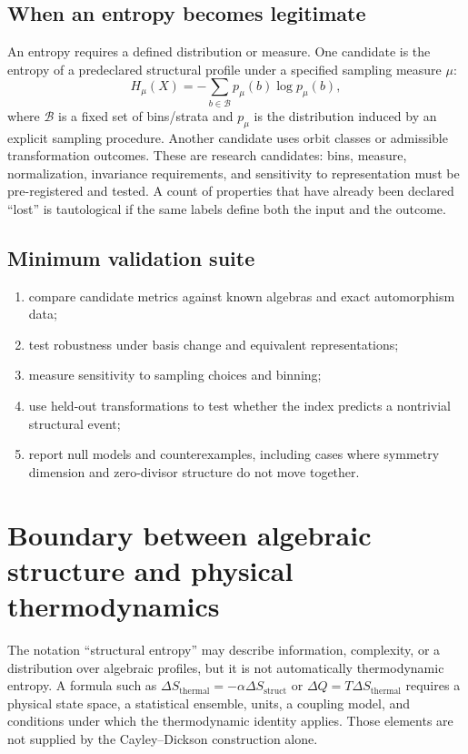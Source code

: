 \documentclass[11pt,oneside]{article}
\begin{document}
\subsection{When an entropy becomes legitimate}
An entropy requires a defined distribution or measure. One candidate is the entropy of a predeclared structural profile under a specified sampling measure $\mu$:
\[
H_\mu(X)=-\sum_{b\in\mathcal{B}}p_\mu(b)\log p_\mu(b),
\]
where $\mathcal{B}$ is a fixed set of bins/strata and $p_\mu$ is the distribution induced by an explicit sampling procedure. Another candidate uses orbit classes or admissible transformation outcomes. These are research candidates: bins, measure, normalization, invariance requirements, and sensitivity to representation must be pre-registered and tested. A count of properties that have already been declared ``lost'' is tautological if the same labels define both the input and the outcome.

\subsection{Minimum validation suite}
\begin{enumerate}
  \item compare candidate metrics against known algebras and exact automorphism data;
  \item test robustness under basis change and equivalent representations;
  \item measure sensitivity to sampling choices and binning;
  \item use held-out transformations to test whether the index predicts a nontrivial structural event;
  \item report null models and counterexamples, including cases where symmetry dimension and zero-divisor structure do not move together.
\end{enumerate}

\section{Boundary between algebraic structure and physical thermodynamics}
The notation ``structural entropy'' may describe information, complexity, or a distribution over algebraic profiles, but it is not automatically thermodynamic entropy. A formula such as $\Delta S_{\mathrm{thermal}}=-\alpha\Delta S_{\mathrm{struct}}$ or $\Delta Q=T\Delta S_{\mathrm{thermal}}$ requires a physical state space, a statistical ensemble, units, a coupling model, and conditions under which the thermodynamic identity applies. Those elements are not supplied by the Cayley--Dickson construction alone.
\end{document}
